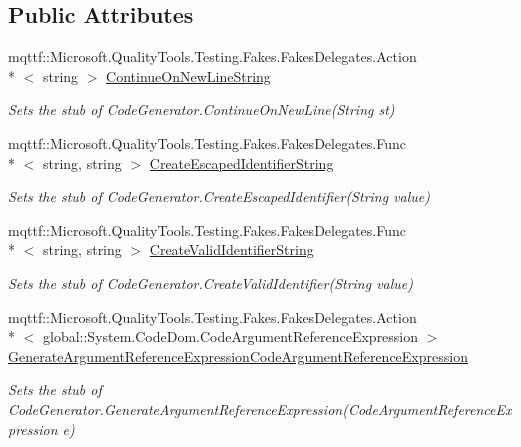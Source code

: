 \subsection*{Public Attributes}
\begin{DoxyCompactItemize}
\item 
mqttf\-::\-Microsoft.\-Quality\-Tools.\-Testing.\-Fakes.\-Fakes\-Delegates.\-Action\\*
$<$ string $>$ \hyperlink{class_system_1_1_code_dom_1_1_compiler_1_1_fakes_1_1_stub_code_generator_a09d677cc77570e277f92b97fd07faad2}{Continue\-On\-New\-Line\-String}
\begin{DoxyCompactList}\small\item\em Sets the stub of Code\-Generator.\-Continue\-On\-New\-Line(\-String st)\end{DoxyCompactList}\item 
mqttf\-::\-Microsoft.\-Quality\-Tools.\-Testing.\-Fakes.\-Fakes\-Delegates.\-Func\\*
$<$ string, string $>$ \hyperlink{class_system_1_1_code_dom_1_1_compiler_1_1_fakes_1_1_stub_code_generator_a7e3deec40164be43ddd66c18ce1ef295}{Create\-Escaped\-Identifier\-String}
\begin{DoxyCompactList}\small\item\em Sets the stub of Code\-Generator.\-Create\-Escaped\-Identifier(\-String value)\end{DoxyCompactList}\item 
mqttf\-::\-Microsoft.\-Quality\-Tools.\-Testing.\-Fakes.\-Fakes\-Delegates.\-Func\\*
$<$ string, string $>$ \hyperlink{class_system_1_1_code_dom_1_1_compiler_1_1_fakes_1_1_stub_code_generator_ab602ca4976742c5c3a1c8db5f232b407}{Create\-Valid\-Identifier\-String}
\begin{DoxyCompactList}\small\item\em Sets the stub of Code\-Generator.\-Create\-Valid\-Identifier(\-String value)\end{DoxyCompactList}\item 
mqttf\-::\-Microsoft.\-Quality\-Tools.\-Testing.\-Fakes.\-Fakes\-Delegates.\-Action\\*
$<$ global\-::\-System.\-Code\-Dom.\-Code\-Argument\-Reference\-Expression $>$ \hyperlink{class_system_1_1_code_dom_1_1_compiler_1_1_fakes_1_1_stub_code_generator_ac7752a24ac2e1fba8ec5346d554abb2d}{Generate\-Argument\-Reference\-Expression\-Code\-Argument\-Reference\-Expression}
\begin{DoxyCompactList}\small\item\em Sets the stub of Code\-Generator.\-Generate\-Argument\-Reference\-Expression(\-Code\-Argument\-Reference\-Expression e)\end{DoxyCompactList}\item 

\end{DoxyCompactItemize}
